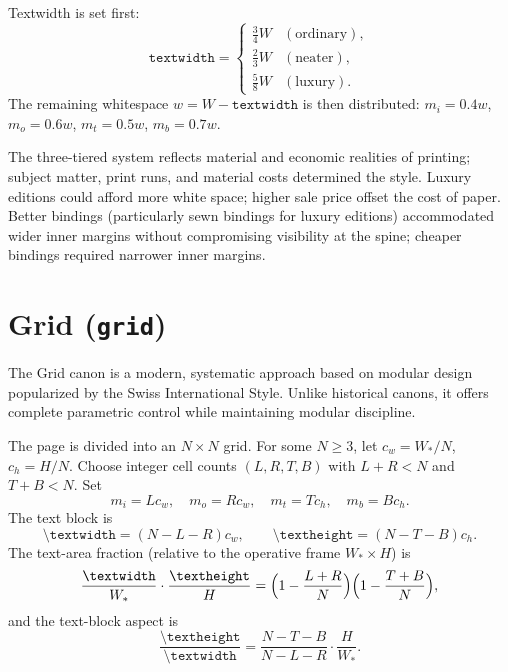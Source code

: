 \documentclass[11pt, twoside, openany]{book}
\newcommand{\cmd}[1]{\texttt{\textbackslash #1}}
\begin{document}
Textwidth is set first:
\[
	\texttt{textwidth} =
	\begin{cases}
		\tfrac{3}{4}W & \mathrm{(ordinary)}, \\
		\tfrac{2}{3}W & \mathrm{(neater)},   \\
		\tfrac{5}{8}W & \mathrm{(luxury)}.   
	\end{cases}
\]
The remaining whitespace $w = W - \texttt{textwidth}$ is then distributed: $m_i = 0.4w$, $m_o = 0.6w$, $m_t = 0.5w$, $m_b = 0.7w$.

The three-tiered system reflects material and economic realities of printing; subject matter, print runs, and material costs determined the style. Luxury editions could afford more white space; higher sale price offset the cost of paper. Better bindings (particularly sewn bindings for luxury editions) accommodated wider inner margins without compromising visibility at the spine; cheaper bindings required narrower inner margins.

\section{Grid (\texttt{grid})}\label{sec:grid}

The Grid canon is a modern, systematic approach based on modular design popularized by the Swiss International Style. Unlike historical canons, it offers complete parametric control while maintaining modular discipline.

The page is divided into an $N \times N$ grid. For some $N \geq 3$, let $c_w = W_\ast/N$, $c_h = H/N$. Choose integer cell counts $(L,R,T,B)$ with $L+R < N$ and $T+B < N$. Set
\[
	m_i = Lc_w,\quad m_o = Rc_w,\quad m_t = Tc_h,\quad m_b = Bc_h.
\]
The text block is
\[
	\cmd{textwidth} = (N-L-R)c_w,\qquad \cmd{textheight} = (N-T-B)c_h.
\]
The text-area fraction (relative to the operative frame $W_\ast \times H$) is
\[
	\frac{\cmd{textwidth}}{W_\ast}\cdot\frac{\cmd{textheight}}{H}
	= \Bigl(1-\frac{L+R}{N}\Bigr)\Bigl(1-\frac{T+B}{N}\Bigr),
\]
and the text-block aspect is
\[
	\frac{\cmd{textheight}}{\cmd{textwidth}}
	= \frac{N-T-B}{N-L-R}\cdot\frac{H}{W_\ast}.
\]
\end{document}
